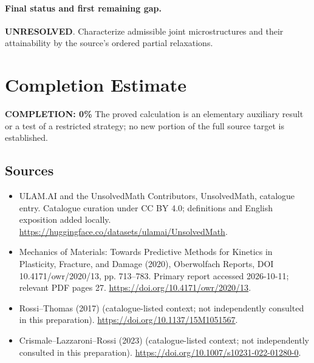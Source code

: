 \documentclass[11pt]{article}
\begin{document}
\paragraph{Final status and first remaining gap.}
\textbf{UNRESOLVED}. Characterize admissible joint microstructures and their attainability by the source’s ordered partial relaxations.

\section{Completion Estimate}
\noindent\textbf{COMPLETION: 0\%}
The proved calculation is an elementary auxiliary result or a test of a restricted strategy; no new portion of the full source target is established.

\subsection{Sources}
\begin{itemize}
\item[\hypertarget{source:statement:1}{S1}] ULAM.AI and the UnsolvedMath Contributors, UnsolvedMath, catalogue entry. Catalogue curation under CC BY 4.0; definitions and English exposition added locally.
\url{https://huggingface.co/datasets/ulamai/UnsolvedMath}.
\item[\hypertarget{source:statement:2}{S2}] Mechanics of Materials: Towards Predictive Methods for Kinetics in Plasticity, Fracture, and Damage (2020), Oberwolfach Reports, DOI 10.4171/owr/2020/13, pp. 713--783. Primary report accessed 2026-10-11; relevant PDF pages 27.
\url{https://doi.org/10.4171/owr/2020/13}.
\item[\hypertarget{source:statement:3}{S3}] Rossi--Thomas (2017) (catalogue-listed context; not independently consulted in this preparation).
\url{https://doi.org/10.1137/15M1051567}.
\item[\hypertarget{source:statement:4}{S4}] Crismale--Lazzaroni--Rossi (2023) (catalogue-listed context; not independently consulted in this preparation).
\url{https://doi.org/10.1007/s10231-022-01280-0}.
\end{itemize}
\label{end:statement}
\end{document}
